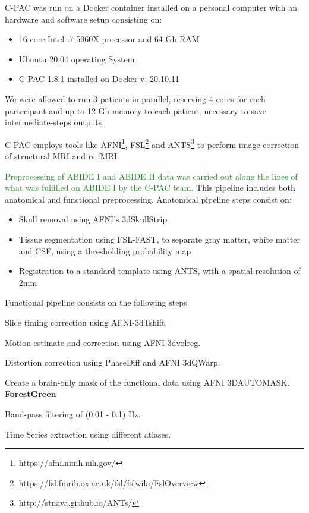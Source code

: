 \documentclass[11pt]{report}
\begin{document}
C-PAC was run on a Docker container installed on a personal computer with an hardware and software setup consisting on:
\begin{itemize}
\item 16-core Intel i7-5960X processor and 64 Gb RAM
\item Ubuntu 20.04 operating System
\item C-PAC 1.8.1 installed on Docker v. 20.10.11
\end{itemize}

We were allowed to run 3 patients in parallel, reserving 4 cores for each partecipant and up to 12 Gb memory to each patient, necessary to save intermediate-steps outputs.

C-PAC employs tools like AFNI\footnote{https://afni.nimh.nih.gov/}, FSL\footnote{https://fsl.fmrib.ox.ac.uk/fsl/fslwiki/FslOverview} and ANTS\footnote{http://stnava.github.io/ANTs/} to perform image correction of structural MRI and rs fMRI.

\textcolor{ForestGreen}{Preprocessing of ABIDE I and ABIDE II data was carried out along the lines of what was fulfilled on ABIDE I by the C-PAC team.}
This pipeline includes both anatomical and functional preprocessing.
Anatomical pipeline steps consist on:
\begin{itemize}
\item Skull removal using AFNI's 3dSkullStrip
\item Tissue segmentation using FSL-FAST, to separate gray matter, white matter and CSF, using a thresholding probability map
\item Registration to a standard template using ANTS, with a spatial resolution of 2mm
\end{itemize}
Functional pipeline consists on the following steps
\begin{itemize}
\item Slice timing correction using AFNI-3dTshift.
\item Motion estimate and correction using AFNI-3dvolreg.
\item Distortion correction using PhaseDiff and AFNI 3dQWarp.
\item Create a brain-only mask of the functional data using AFNI 3DAUTOMASK.
\textbf{ForestGreen}{
\item Band-pass filtering of (0.01 - 0.1) Hz.
\item Time Series extraction using different atlases.
}
\end{itemize}
\end{document}
